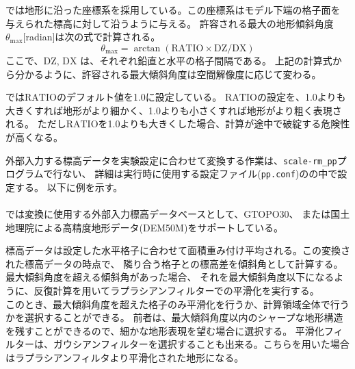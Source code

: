 \section{\SecBasicTopoSetting} \label{subsec:basic_usel_topo}

\scalerm では地形に沿った座標系を採用している。この座標系はモデル下端の格子面を
与えられた標高に対して沿うように与える。
許容される最大の地形傾斜角度$\theta_{\max}$[radian]は次の式で計算される。
\[
  \theta_{\max} = \arctan( \mathrm{RATIO} \times \mathrm{DZ}/\mathrm{DX} )
\]
ここで、$\mathrm{DZ}$, $\mathrm{DX}$ は、それぞれ鉛直と水平の格子間隔である。
上記の計算式から分かるように、許容される最大傾斜角度は空間解像度に応じて変わる。

\scalerm では$\mathrm{RATIO}$のデフォルト値を1.0に設定している。
$\mathrm{RATIO}$の設定を、1.0よりも大きくすれば地形がより細かく、1.0よりも小さくすれば地形がより粗く表現される。
ただし$\mathrm{RATIO}$を1.0よりも大きくした場合、計算が途中で破綻する危険性が高くなる。

外部入力する標高データを実験設定に合わせて変換する作業は、\verb|scale-rm_pp|プログラムで行ない、
詳細は実行時に使用する設定ファイル(\verb|pp.conf|)のの中で設定する。
以下に例を示す。\\

\\

\scalerm では変換に使用する外部入力標高データベースとして、GTOPO30、
または国土地理院による高精度地形データ(DEM50M)をサポートしている。


標高データは設定した水平格子に合わせて面積重み付け平均される。この変換された標高データの時点で、
隣り合う格子との標高差を傾斜角として計算する。最大傾斜角度を超える傾斜角があった場合、
それを最大傾斜角度以下になるように、反復計算を用いてラプラシアンフィルターでの平滑化を実行する。\\
このとき、最大傾斜角度を超えた格子のみ平滑化を行うか、計算領域全体で行うかを選択することができる。
前者は、最大傾斜角度以内のシャープな地形構造を残すことができるので、細かな地形表現を望む場合に選択する。
平滑化フィルターは、ガウシアンフィルターを選択することも出来る。こちらを用いた場合はラプラシアンフィルタより平滑化された地形になる。


